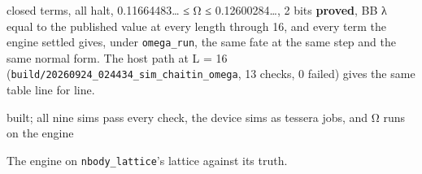 \begin{description}
closed terms, all halt, 0.11664483… ≤ Ω ≤ 0.12600284…, 2 bits \textbf{proved}, BB λ equal to the published value at every length through 16, and every term the engine settled gives, under \texttt{omega\_\allowbreak{}run}, the same fate at the same step and the same normal form. The host path at L = 16 (\texttt{build/\allowbreak{}20260924\_\allowbreak{}024434\_\allowbreak{}sim\_\allowbreak{}chaitin\_\allowbreak{}omega}, 13 checks, 0 failed) gives the same table line for line.
\item[{status}] built; all nine sims pass every check, the device sims as tessera jobs, and Ω runs on the engine
\item[{next}] The engine on \texttt{nbody\_\allowbreak{}lattice}'s lattice against its truth.
\end{description}

